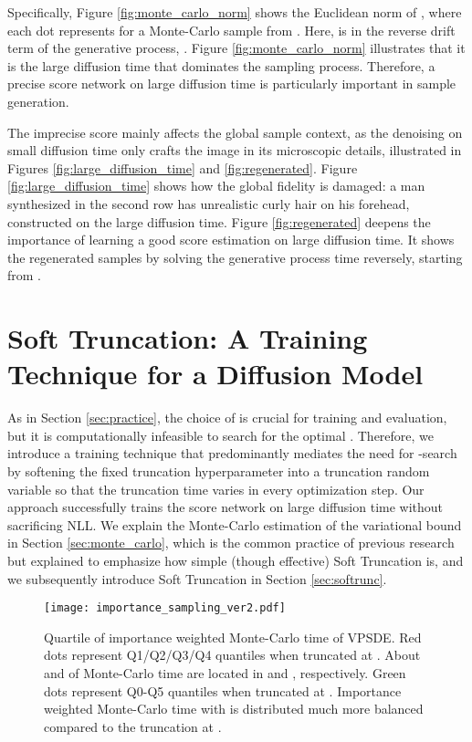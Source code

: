 \documentclass[nohyperref]{article}
\theoremstyle{plain}
\theoremstyle{definition}
\theoremstyle{remark}
\begin{document}
Specifically, Figure \ref{fig:monte_carlo_norm} shows the Euclidean norm of , where each dot represents for a Monte-Carlo sample from . Here,  is in the reverse drift term of the generative process, . Figure \ref{fig:monte_carlo_norm} illustrates that it is the large diffusion time that dominates the sampling process. Therefore, a precise score network on large diffusion time is particularly important in sample generation. 

The imprecise score mainly affects the global sample context, as the denoising on small diffusion time only crafts the image in its microscopic details, illustrated in Figures \ref{fig:large_diffusion_time} and \ref{fig:regenerated}. Figure \ref{fig:large_diffusion_time} shows how the global fidelity is damaged: a man synthesized in the second row has unrealistic curly hair on his forehead, constructed on the large diffusion time. Figure \ref{fig:regenerated} deepens the importance of learning a good score estimation on large diffusion time. It shows the regenerated samples by solving the generative process time reversely, starting from  \cite{meng2021sdedit}.


\section{Soft Truncation: A Training Technique for a Diffusion Model}

As in Section \ref{sec:practice}, the choice of  is crucial for training and evaluation, but it is computationally infeasible to search for the optimal . Therefore, we introduce a training technique that predominantly mediates the need for -search by softening the fixed truncation hyperparameter into a truncation random variable so that the truncation time varies in every optimization step. Our approach successfully trains the score network on large diffusion time without sacrificing NLL. We explain the Monte-Carlo estimation of the variational bound in Section \ref{sec:monte_carlo}, which is the common practice of previous research but explained to emphasize how simple (though effective) Soft Truncation is, and we subsequently introduce Soft Truncation in Section \ref{sec:softrunc}.

\begin{figure*}[t]
\centering
\texttt{[image: importance\_sampling\_ver2.pdf]}
\caption{Quartile of importance weighted Monte-Carlo time of VPSDE. Red dots represent Q1/Q2/Q3/Q4 quantiles when truncated at . About  and  of Monte-Carlo time are located in  and , respectively. Green dots represent Q0-Q5 quantiles when truncated at . Importance weighted Monte-Carlo time with  is distributed much more balanced compared to the truncation at .}
\label{fig:importance_sampling}
\end{figure*}
\end{document}
